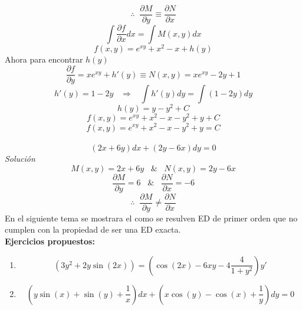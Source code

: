 \documentclass[10pt]{article}
\begin{document}
\[\therefore\;\;\frac{\partial{M}}{\partial{y}}\equiv\frac{\partial{N}}{\partial{x}}\]
\[\int\frac{\partial{f}}{\partial{x}}dx=\int M(x,y)dx\]
\[f(x,y)=e^{xy}+x^{2}-x+h(y)\]
Ahora para encontrar $h(y)$
\[\frac{\partial{f}}{\partial{y}}=xe^{xy}+h'(y)\equiv N(x,y)=xe^{xy}-2y+1\]
\[h'(y)=1-2y\;\;\;\Rightarrow\;\;\;\int h'(y)dy=\int(1-2y)dy\]
\[h(y)=y-y^{2}+C\]
\[f(x,y)=e^{xy}+x^{2}-x-y^{2}+y+C\]
\[f(x,y)=e^{xy}+x^{2}-x-y^{2}+y=C\]
\vspace{0.5cm}\\
\[(2x+6y)dx+(2y-6x)dy=0\]
\textit{Solución}
\[M(x,y)=2x+6y\;\;\;\&\;\;\;N(x,y)=2y-6x\]
\[\frac{\partial{M}}{\partial{y}}=6\;\;\;\&\;\;\;\frac{\partial{N}}{\partial{x}}=-6\]
\[\therefore\;\;\frac{\partial{M}}{\partial{y}}\neq\frac{\partial{N}}{\partial{x}}\]
En el siguiente tema se mostrara el como se resulven ED de primer orden que no cumplen con la propiedad de ser una ED exacta.
\vspace{1.5cm}\\
\textbf{Ejercicios propuestos:}
\begin{enumerate}
  \item \[(3y^{2}+2y\sin(2x))=\left(\cos(2x)-6xy-4\frac{4}{1+y^{2}}\right)y'\]
  \item \[\left(y\sin(x)+\sin(y)+\frac{1}{x}\right)dx+\left(x\cos(y)-\cos(x)+\frac{1}{y}\right)dy=0\]
\end{enumerate}
\clearpage
\end{document}
